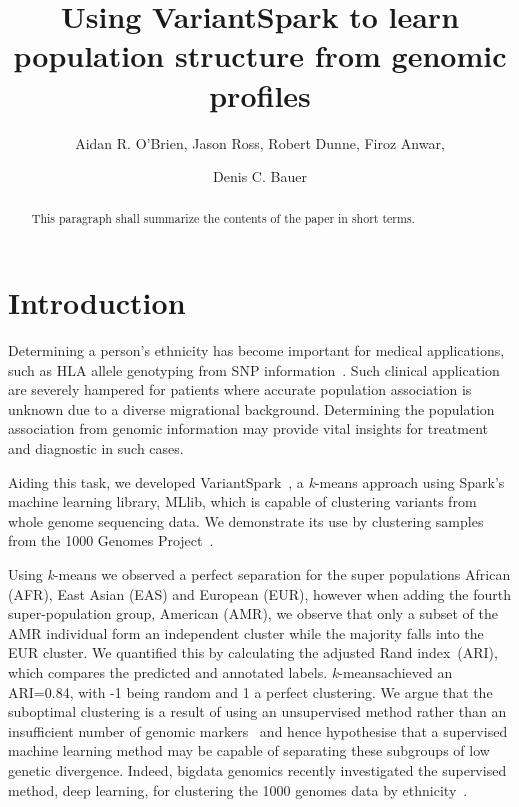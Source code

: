 \documentclass{llncs}
\newcommand{\variantSpark}{{\sc VariantSpark}}
\newcommand{\kMeans}{\textit{k}-means}
\newcommand{\ARI}{adjusted Rand index}
\begin{document}
\setcounter{save}{\value{section}}
{\def\addtocontents#1#2{}%
\def\addcontentsline#1#2#3{}%
\def\markboth#1#2{}%
%
\title{Using VariantSpark to learn population structure from genomic profiles}

\author{Aidan R. O'Brien, Jason Ross, Robert Dunne, Firoz Anwar, \and Denis C. Bauer}


\maketitle
%
\begin{abstract}
This paragraph shall summarize the contents of the paper
in short terms.
\end{abstract}
%
\section{Introduction}
%


Determining a person's ethnicity has become important for medical applications, such as HLA allele genotyping from SNP
information~\cite{Zheng2014}. Such clinical application are severely hampered for patients where accurate population
association is unknown due to a diverse migrational background. Determining the population association from genomic
information may provide vital insights for treatment and diagnostic in such cases.

Aiding this task, we developed \variantSpark~\cite{OBrien}, a \kMeans{} approach using {\sc Spark}'s machine learning
library, {\sc MLlib}, which is capable of clustering variants from whole genome sequencing data.  We demonstrate its use
by clustering samples from the 1000 Genomes Project~\cite{1KG2012}. 

Using \kMeans{} we observed a perfect separation for the super populations African (AFR), East Asian (EAS) and European
(EUR), however when adding the fourth super-population group, American (AMR), we observe that only a subset of the AMR
individual form an independent cluster while the majority falls into the EUR cluster. 
We quantified this by calculating the \ARI\ (ARI), which compares the predicted and annotated labels. \kMeans achieved an ARI=0.84,
with -1 being random and 1 a perfect clustering.  We argue that the suboptimal clustering is a result of using an
unsupervised method rather than an insufficient number of genomic markers~\cite{Patterson2006} and hence hypothesise
that a supervised machine learning method may be capable of separating these subgroups of low genetic divergence.
Indeed, bigdata genomics recently investigated the supervised method, deep learning, for clustering the 1000 genomes
data by ethnicity~\cite{Ferguson}.

}
\end{document}
